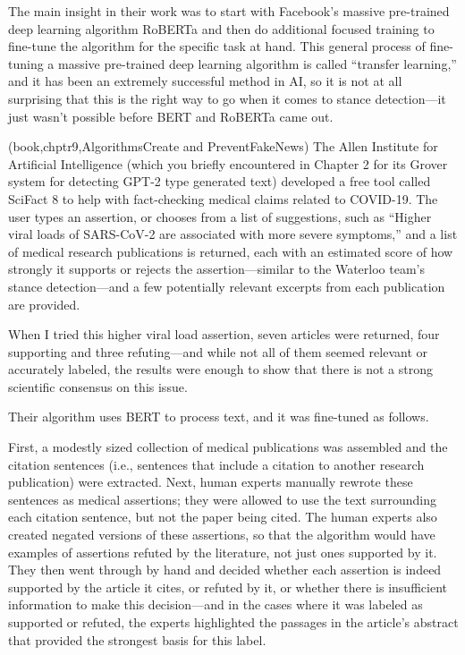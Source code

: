 The main insight in their work was to start with Facebook’s massive pre-trained deep learning algorithm RoBERTa and then do additional focused training to fine-tune the algorithm for the specific task at hand. This general process of fine-tuning a massive pre-trained deep learning algorithm is called “transfer learning,” and it has been an extremely successful method in AI, so it is not at all surprising that this is the right way to go when it comes to stance detection—it just wasn’t possible before BERT and RoBERTa came out.




{\color{orange}(book,chptr9,AlgorithmsCreate and PreventFakeNews)}
The Allen Institute for Artificial Intelligence (which you briefly encountered in Chapter 2 for its Grover system for detecting GPT-2 type generated text) developed a free tool called SciFact 8 to help with fact-checking medical claims related to COVID-19. The user types an assertion, or chooses from a list of suggestions, such as “Higher viral loads of SARS-CoV-2 are associated with more severe symptoms,” and a list of medical research publications is returned, each with an estimated score of how strongly it supports or rejects the assertion—similar to the Waterloo team’s stance detection—and a few potentially relevant excerpts from each publication are provided.

When I tried this higher viral load assertion, seven articles were returned, four supporting and three refuting—and while not all of them seemed relevant or accurately labeled, the results were enough to show that there is not a strong scientific consensus on this issue.

Their algorithm uses BERT to process text, and it was fine-tuned as follows. 

First, a modestly sized collection of medical publications was assembled and the citation sentences (i.e., sentences that include a citation to another research publication) were extracted. Next, human experts manually rewrote these sentences as medical assertions; they were allowed to use the text surrounding each citation sentence, but not the paper being cited. The human experts also created negated versions of these assertions, so that the algorithm would have examples of assertions refuted by the literature, not just ones supported by it. They then went through by hand and decided
whether each assertion is indeed supported by the article it cites, or refuted by it, or whether there is insufficient information to make this decision—and in the cases where it was labeled as supported or refuted, the experts highlighted the passages in the article’s abstract that provided the strongest basis for this label. 

